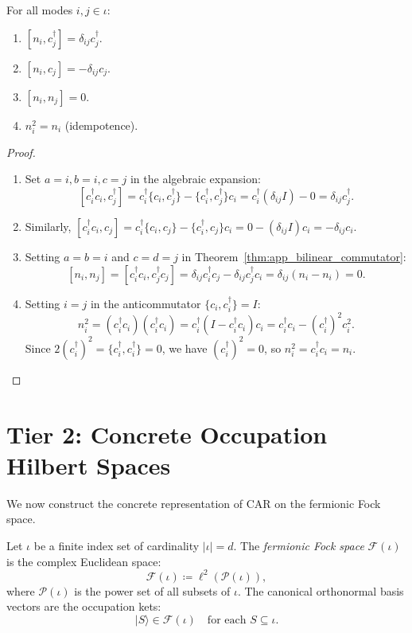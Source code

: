 \begin{corollary}
\label{cor:app_number_comm}
For all modes $i, j \in \iota$:
\begin{enumerate}
    \item $[n_i, c_j^\dagger] = \delta_{ij} c_j^\dagger$.
    \item $[n_i, c_j] = - \delta_{ij} c_j$.
    \item $[n_i, n_j] = 0$.
    \item $n_i^2 = n_i$ (idempotence).
\end{enumerate}
\end{corollary}

\begin{proof}
\begin{enumerate}
    \item Set $a = i, b = i, c = j$ in the algebraic expansion:
    \[
    [c_i^\dagger c_i, c_j^\dagger] = c_i^\dagger \{c_i, c_j^\dagger\} - \{c_i^\dagger, c_j^\dagger\} c_i = c_i^\dagger (\delta_{ij} I) - 0 = \delta_{ij} c_j^\dagger.
    \]
    \item Similarly, $[c_i^\dagger c_i, c_j] = c_i^\dagger \{c_i, c_j\} - \{c_i^\dagger, c_j\} c_i = 0 - (\delta_{ij} I) c_i = - \delta_{ij} c_i$.
    \item Setting $a = b = i$ and $c = d = j$ in Theorem~\ref{thm:app_bilinear_commutator}:
    \[
    [n_i, n_j] = [c_i^\dagger c_i, c_j^\dagger c_j] = \delta_{ij} c_i^\dagger c_j - \delta_{ij} c_j^\dagger c_i = \delta_{ij} (n_i - n_i) = 0.
    \]
    \item Setting $i = j$ in the anticommutator $\{c_i, c_i^\dagger\} = I$:
    \[
    n_i^2 = (c_i^\dagger c_i)(c_i^\dagger c_i) = c_i^\dagger (I - c_i^\dagger c_i) c_i = c_i^\dagger c_i - (c_i^\dagger)^2 c_i^2.
    \]
    Since $2 (c_i^\dagger)^2 = \{c_i^\dagger, c_i^\dagger\} = 0$, we have $(c_i^\dagger)^2 = 0$, so $n_i^2 = c_i^\dagger c_i = n_i$.
\end{enumerate}
\end{proof}

\section{Tier 2: Concrete Occupation Hilbert Spaces}

We now construct the concrete representation of CAR on the fermionic Fock space.

\begin{definition}
Let $\iota$ be a finite index set of cardinality $|\iota| = d$. The \emph{fermionic Fock space} $\mathcal{F}(\iota)$ is the complex Euclidean space:
\begin{equation}
\mathcal{F}(\iota) \coloneqq \ell^2(\mathcal{P}(\iota)),
\end{equation}
where $\mathcal{P}(\iota)$ is the power set of all subsets of $\iota$.
The canonical orthonormal basis vectors are the occupation kets:
\begin{equation}
|S\rangle \in \mathcal{F}(\iota) \quad \text{for each } S \subseteq \iota.
\end{equation}
\end{definition}

